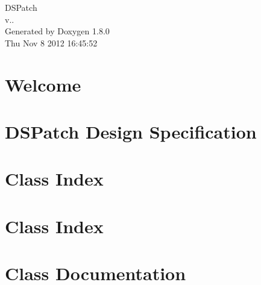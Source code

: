 \documentclass{book}
\begin{document}
\begin{titlepage}
\vspace*{7cm}
\begin{center}
{\Large D\-S\-Patch \\[1ex]\large v.. }\\
\vspace*{1cm}
{\large Generated by Doxygen 1.8.0}\\
\vspace*{0.5cm}
{\small Thu Nov 8 2012 16:45:52}\\
\end{center}
\end{titlepage}
\clearemptydoublepage
{}
\tableofcontents
\clearemptydoublepage
{}
\chapter{Welcome}
\label{index}
\chapter{D\-S\-Patch Design Specification}
\label{spec_page}

\chapter{Class Index}

\chapter{Class Index}

\chapter{Class Documentation}












\printindex
\end{document}
